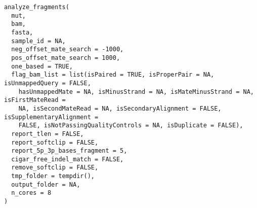 \documentclass[a4paper]{book}
\begin{document}
%
\begin{Usage}
\begin{verbatim}
analyze_fragments(
  mut,
  bam,
  fasta,
  sample_id = NA,
  neg_offset_mate_search = -1000,
  pos_offset_mate_search = 1000,
  one_based = TRUE,
  flag_bam_list = list(isPaired = TRUE, isProperPair = NA, isUnmappedQuery = FALSE,
    hasUnmappedMate = NA, isMinusStrand = NA, isMateMinusStrand = NA, isFirstMateRead =
    NA, isSecondMateRead = NA, isSecondaryAlignment = FALSE, isSupplementaryAlignment =
    FALSE, isNotPassingQualityControls = NA, isDuplicate = FALSE),
  report_tlen = FALSE,
  report_softclip = FALSE,
  report_5p_3p_bases_fragment = 5,
  cigar_free_indel_match = FALSE,
  remove_softclip = FALSE,
  tmp_folder = tempdir(),
  output_folder = NA,
  n_cores = 8
)
\end{verbatim}
\end{Usage}
%
\end{document}
